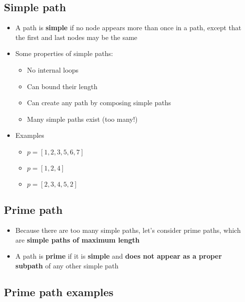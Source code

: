 \documentclass[12pt]{book}
\begin{document}
\subsection{Simple path}

\begin{itemize}
  \item A path is \textbf{simple} if no node appears more than once in a path, except that the first and last nodes may be the same
  \item Some properties of simple paths:
  \begin{itemize}
    \item No internal loops
    \item Can bound their length
    \item Can create any path by composing simple paths
    \item Many simple paths exist (too many!)
  \end{itemize} 

  \item Examples
  \begin{itemize}
    \item $p=[1,2,3,5,6,7]$
    \item $p=[1,2,4]$
    \item $p=[2,3,4,5,2]$
  \end{itemize} 
\end{itemize}

\subsection{Prime path}

\begin{itemize}
  \item Because there are too many simple paths, let's consider prime paths, which are \textbf{simple paths of maximum length}
  \item A path is \textbf{prime} if it is \textbf{simple} and \textbf{does not appear as a proper subpath} of any other simple path
\end{itemize}

\subsection{Prime path examples}
\end{document}
